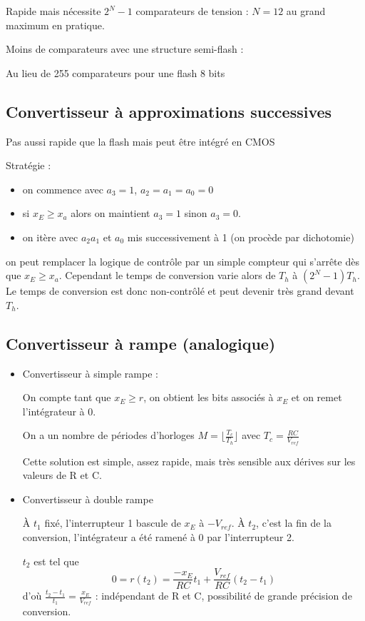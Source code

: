 \documentclass[main.tex]{subfiles}
\begin{document}
Rapide mais nécessite $2^N-1$ comparateurs de tension : $N=12$ au grand maximum en pratique.

Moins de comparateurs avec une structure semi-flash :

Au lieu de 255 comparateurs pour une flash 8 bits

\subsection{Convertisseur à approximations successives}

Pas aussi rapide que la flash mais peut être intégré en CMOS

Stratégie :
\begin{itemize}
\item on commence avec $a_3=1$, $a_2=a_1=a_0=0$
\item si $x_E \geq x_a$ alors on maintient $a_3 = 1$ sinon $a_3=0$.
\item on itère avec $a_2 a_1 $ et $a_0$ mis successivement à 1 (on procède par dichotomie)
\end{itemize}

\begin{rem}
on peut remplacer la logique de contrôle par un simple compteur qui s'arrête dès que $x_E \geq x_a$. Cependant le temps de conversion varie alors de $T_h$ à $(2^N-1)T_h$. Le temps de conversion est donc non-contrôlé et peut devenir très grand devant $T_h$.
\end{rem}

\subsection{Convertisseur à rampe (analogique)}

\begin{itemize}
\item Convertisseur à simple rampe :



On compte tant que $x_E \geq r$, on obtient les bits associés à $x_E$ et on remet l'intégrateur à 0.

On a un nombre de périodes d'horloges $M=\lfloor\frac{T_c}{T_h}\rfloor$ avec $T_c = \frac{RC}{V_{ref}}$

Cette solution est simple, assez rapide, mais très sensible aux dérives sur les valeurs de R et C.

\item Convertisseur à double rampe


À $t_1$ fixé, l'interrupteur 1 bascule de $x_E$ à $-V_{ref}$.
À $t_2$, c'est la fin de la conversion, l'intégrateur a été ramené à 0 par l'interrupteur 2.


$t_2$ est tel que \[0=r(t_2) = \frac{-x_E}{RC}t_1 + \frac{V_{ref}}{RC}(t_2-t_1)\] d'où $\frac{t_2-t_1}{t_1} = \frac{x_E}{V_{ref}}$ : indépendant de R et C, possibilité de grande précision de conversion.
\end{itemize}
\end{document}
